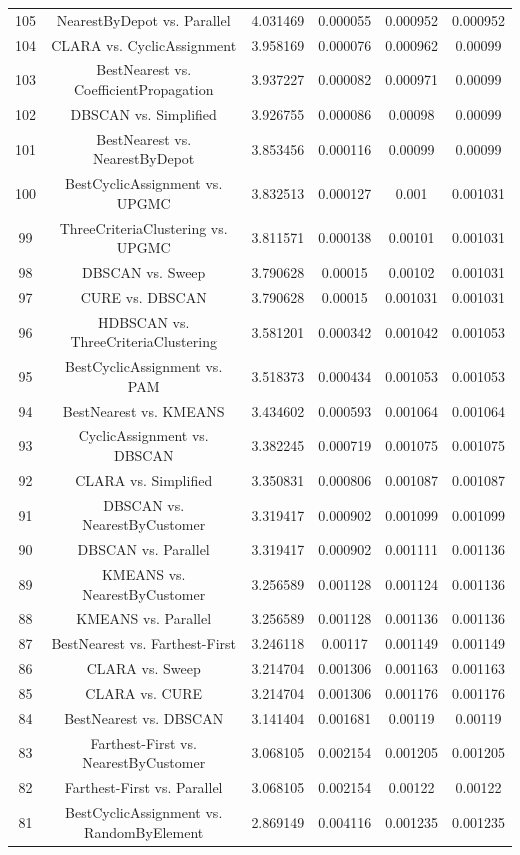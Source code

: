 \documentclass[a4paper,10pt]{article}
\begin{document}
\begin{landscape}
\begin{table}[!htp]
\begin{tabular}{cccccc}
105&NearestByDepot vs. Parallel&4.031469&0.000055&0.000952&0.000952\\
104&CLARA vs. CyclicAssignment&3.958169&0.000076&0.000962&0.00099\\
103&BestNearest vs. CoefficientPropagation&3.937227&0.000082&0.000971&0.00099\\
102&DBSCAN vs. Simplified&3.926755&0.000086&0.00098&0.00099\\
101&BestNearest vs. NearestByDepot&3.853456&0.000116&0.00099&0.00099\\
100&BestCyclicAssignment vs. UPGMC&3.832513&0.000127&0.001&0.001031\\
99&ThreeCriteriaClustering vs. UPGMC&3.811571&0.000138&0.00101&0.001031\\
98&DBSCAN vs. Sweep&3.790628&0.00015&0.00102&0.001031\\
97&CURE vs. DBSCAN&3.790628&0.00015&0.001031&0.001031\\
96&HDBSCAN vs. ThreeCriteriaClustering&3.581201&0.000342&0.001042&0.001053\\
95&BestCyclicAssignment vs. PAM&3.518373&0.000434&0.001053&0.001053\\
94&BestNearest vs. KMEANS&3.434602&0.000593&0.001064&0.001064\\
93&CyclicAssignment vs. DBSCAN&3.382245&0.000719&0.001075&0.001075\\
92&CLARA vs. Simplified&3.350831&0.000806&0.001087&0.001087\\
91&DBSCAN vs. NearestByCustomer&3.319417&0.000902&0.001099&0.001099\\
90&DBSCAN vs. Parallel&3.319417&0.000902&0.001111&0.001136\\
89&KMEANS vs. NearestByCustomer&3.256589&0.001128&0.001124&0.001136\\
88&KMEANS vs. Parallel&3.256589&0.001128&0.001136&0.001136\\
87&BestNearest vs. Farthest-First&3.246118&0.00117&0.001149&0.001149\\
86&CLARA vs. Sweep&3.214704&0.001306&0.001163&0.001163\\
85&CLARA vs. CURE&3.214704&0.001306&0.001176&0.001176\\
84&BestNearest vs. DBSCAN&3.141404&0.001681&0.00119&0.00119\\
83&Farthest-First vs. NearestByCustomer&3.068105&0.002154&0.001205&0.001205\\
82&Farthest-First vs. Parallel&3.068105&0.002154&0.00122&0.00122\\
81&BestCyclicAssignment vs. RandomByElement&2.869149&0.004116&0.001235&0.001235\\

\end{tabular}
\end{table}
\end{landscape}
\end{document}

